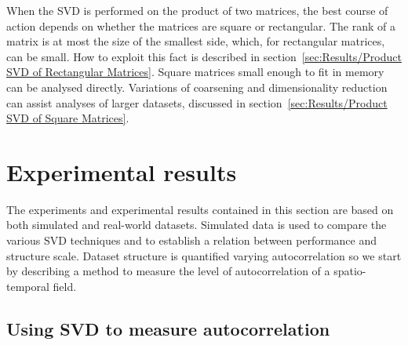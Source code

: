 \documentclass[ijgi,article,submit,moreauthors,pdftex,10pt,a4paper]{Definitions/mdpi}
\begin{document}
When the SVD is performed on the product of two matrices, the best course of action depends on whether the matrices are square or rectangular. The rank of a matrix is at most the size of the smallest side, which, for rectangular matrices, can be small. How to exploit this fact is described in section~\ref{sec:Results/Product SVD of Rectangular Matrices}. Square matrices small enough to fit in memory can be analysed directly. Variations of coarsening and dimensionality reduction can assist analyses of larger datasets, discussed in section~\ref{sec:Results/Product SVD of Square Matrices}.





\section{Experimental results}
\label{sec:ExperimentalResults}
The experiments and experimental results contained in this section are based on both simulated and real-world datasets. Simulated data is used to compare the various SVD techniques and to establish a relation between performance and structure scale. Dataset structure is quantified varying autocorrelation so we start by describing a method to measure the level of autocorrelation of a spatio-temporal field.

\subsection{Using SVD to measure autocorrelation}
\label{sec:Materials and Methods/Simulated Spatio-Temporal Fields}
\end{document}

